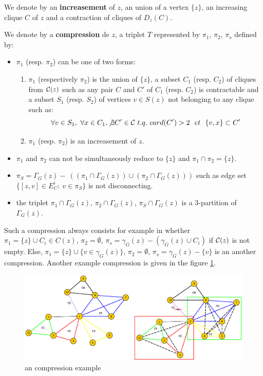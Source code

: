 We denote by an \textbf{increasement} of $z$, an union of 
a vertex $\{z\}$, 
an increasing clique $C$ of $z$ and 
a contraction of cliques of $D_{z}(C)$.

\begin{definition}
We denote by a {\bf compression} de $z$, a triplet $T$ represented by $\pi_1$, $\pi_2$, $\pi_s$  defined by: 
	
\begin{itemize}	
	\item  $\pi_1$ (resp. $\pi_2$) can be one of two forms:
	\begin{enumerate} 		
		\item $\pi_1$ (respectively $\pi_2$) is the union of $\{z\}$, a subset $C_1$ (resp. $C_2$) of cliques from  ${\cal C}(z)$ such as any pair $C$ and $C'$ of $C_1$ (resp. $C_2$) is contractable and a subset $S_1$ (resp. $S_2$) of vertices $v \in S(z)$ not belonging to any clique such as:			
$$ \forall v \in S_1,~\forall x \in C_1, \not\exists C' \in {\cal C}~t.q.~card(C')>2~~et~~\{v,x\} \subset C'$$			
		\item $\pi_1$ (resp. $\pi_2$)  is an increasement of $z$.
	\end{enumerate}
	\item  $\pi_1$ and $\pi_2$ can not be simultaneously reduce to $\{z\}$ and  $\pi_1 \cap \pi_2 = \{z\}$.
	\item $\pi_S=\Gamma_G(z)-~((\pi_1 \cap \Gamma_G(z)) \cup(\pi_2 \cap \Gamma_G(z)))$ such as edge set $\{[z,v]\in E_{C}^{i}:~v\in \pi_S\}$  is not disconnecting. 	
	\item the triplet $\pi_{1} \cap \Gamma_{G}(z)$, $\pi_{2} \cap \Gamma_{G}(z)$, $\pi_{S} \cap \Gamma_{G}(z)$ is a 3-partition of $\Gamma_{G}(z)$.
\end{itemize}

\end{definition}


Such a compression always consists for example in whether 
$\pi_1 = \{z\} \cup C_i \in C(z)$, 
$\pi_2 =  \emptyset$,
$\pi_s = \gamma_G(z) -(\gamma_G(z) \cup C_i) $  if ${\cal C}(z)$ is not empty.
Else, 
$\pi_1 = \{z\} \cup \{ v \in \gamma_G(z)  \} $, 
$\pi_2 =  \emptyset$,
$\pi_s = \gamma_G(z) - \{v\} $
is an another compression.
Another example compression is given in the figure \ref{correctionGraph}.
\begin{centering} 
\begin{figure}[htb!]
\includegraphics[scale=0.30]{./imagesLineGraphes/correctionGraph.eps} \vspace{-0.5em}
\caption{an compression example}
\label{correctionGraph}
\end{figure}
\end{centering} 


